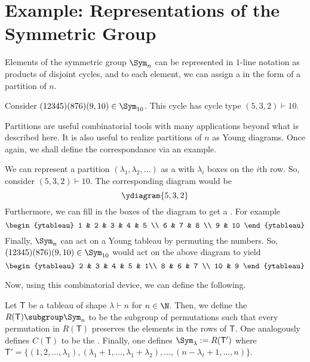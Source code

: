 \documentclass[11pt,leqno,oneside]{amsbook}
\newcommand{\partitionof}{\vdash}
\newcommand{\T}{\mathsf{T}} %
\numberwithin{thm}{section}
\begin{document}
\section{Example: Representations of the Symmetric Group}
Elements of the symmetric group \(\Sym_n\) can be represented in
\(1\)-line notation as products of disjoint cycles, and to each
element, we can assign a  in the form of a partition of
\(n\).
\begin{example}
  Consider \((12345)(876)(9,10) \in \Sym_{10}\). This cycle has cycle
  type \((5,3,2) \partitionof 10\). 
\end{example}
Partitions are useful combinatorial tools with many applications
beyond what is described here.
It is also useful to realize partitions of \(n\) as Young
diagrams. Once again, we shall define the correspondance via an
example.
\begin{example}
  We can represent a partition \((\lambda_1, \lambda_2, \ldots)\) as a
   with \(\lambda_i\) boxes on the \(i\)th row. So,
  consider \((5,3,2) \partitionof 10\). The corresponding diagram
  would be \[
    \ydiagram{5,3,2}
  \]
  Furthermore, we can fill in the boxes of the diagram to get a . For example \[ 
    \begin{ytableau}
      1 & 2 & 3 & 4 & 5 \\
      6 & 7 & 8 \\
      9 & 10
    \end{ytableau}
  \]
  Finally, \(\Sym_n\) can act on a Young tableau by permuting the
  numbers. So, \((12345)(876)(9,10) \in \Sym_{10}\) would act on the
  above diagram to yield \[
    \begin{ytableau}
      2 & 3 & 4 & 5 & 1\\
      8 & 6 & 7 \\
      10 & 9
    \end{ytableau}
  \]
\end{example}
Now, using this combinatorial device, we can define the following.
\begin{defn}
  Let \(\T\) be a tableau of shape \(\lambda \partitionof n\) for \(n
  \in \N\). Then, we define the 
  \(R(\T) \subgroup \Sym_n\) to be the subgroup of
  permutations such that
  every permutation in \(R(\T)\) preserves the elements in
  the rows of \(\T\). One analogously defines \(C(\T)\) to be the
  . Finally, one defines
  \(\Sym_\lambda := R(\T')\) where \(\T' = \{(1, 2, \ldots,
  \lambda_1), (\lambda_1+1, \ldots, \lambda_1 + \lambda_2), \ldots,
  (n-\lambda_\ell+1, \ldots, n)\}\).
\end{defn}
\end{document}
